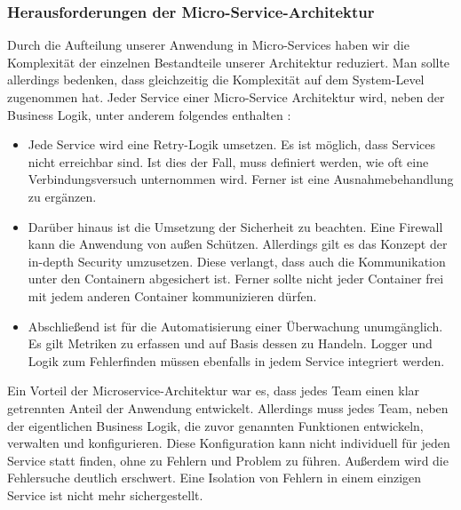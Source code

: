 \subsubsection{Herausforderungen der Micro-Service-Architektur}
Durch die Aufteilung unserer Anwendung in Micro-Services haben wir die Komplexität der einzelnen Bestandteile unserer Architektur reduziert. Man sollte allerdings bedenken, dass gleichzeitig die Komplexität auf dem System-Level zugenommen hat. Jeder Service einer Micro-Service Architektur wird, neben der Business Logik, unter anderem folgendes enthalten \cite{codingwithnana_istio_nodate}:
\begin{itemize}
    \item Jede Service wird eine Retry-Logik umsetzen. Es ist möglich, dass Services nicht erreichbar sind. Ist dies der Fall, muss definiert werden, wie oft eine Verbindungsversuch unternommen wird. Ferner ist eine Ausnahmebehandlung zu ergänzen.
    \item Darüber hinaus ist die Umsetzung der Sicherheit zu beachten. Eine Firewall kann die Anwendung von außen Schützen. Allerdings gilt es das Konzept der in-depth Security umzusetzen. Diese verlangt, dass auch die Kommunikation unter den Containern abgesichert ist. Ferner sollte nicht jeder Container frei mit jedem anderen Container kommunizieren dürfen.
    \item Abschließend ist für die Automatisierung einer Überwachung unumgänglich. Es gilt Metriken zu erfassen und auf Basis dessen zu Handeln. Logger und Logik zum Fehlerfinden müssen ebenfalls in jedem Service integriert werden.
\end{itemize}
Ein Vorteil der Microservice-Architektur war es, dass jedes Team einen klar getrennten Anteil der Anwendung entwickelt. Allerdings muss jedes Team, neben der eigentlichen Business Logik, die zuvor genannten Funktionen entwickeln, verwalten und konfigurieren. Diese Konfiguration kann nicht individuell für jeden Service statt finden, ohne zu Fehlern und Problem zu führen. Außerdem wird die Fehlersuche deutlich erschwert. Eine Isolation von Fehlern in einem einzigen Service ist nicht mehr sichergestellt.

